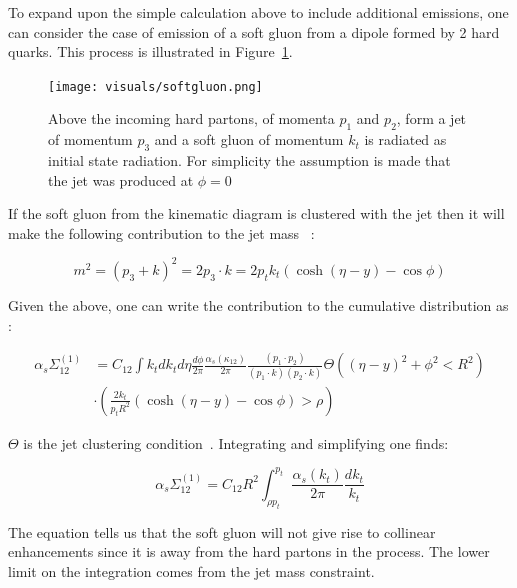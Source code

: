 To expand upon the simple calculation above to include additional emissions, one can consider the case of emission of a soft gluon from a dipole formed by 2 hard quarks. This process is illustrated in Figure~\ref{softgluon}.



\begin{figure}[htb]
\centering
\texttt{[image: visuals/softgluon.png]}
\caption{Above the incoming hard partons, of momenta $p_1$ and $p_2$, form a jet of momentum $p_3$ and a soft gluon of momentum $k_t$ is radiated as initial state radiation. For simplicity the assumption is made that the jet was produced at $\phi = 0$  }
\label{softgluon}
\end{figure}


If the soft gluon from the kinematic diagram is clustered with the jet then it will make the following contribution to the jet mass ~\cite{Marzani:2019hun}:\newline


\begin{equation}
m^{2}=\left(p_{3}+k\right)^{2}=2 p_{3} \cdot k=2 p_{t} k_{t}(\cosh (\eta-y)-\cos \phi)
\end{equation}

Given the above, one can write the contribution to the cumulative distribution as :\newline

\begin{equation}
\begin{aligned} \alpha_{s} \Sigma_{12}^{(1)} &=C_{12} \int k_{t} d k_{t} d \eta \frac{d \phi}{2 \pi} \frac{\alpha_{s}\left(\kappa_{12}\right)}{2 \pi} \frac{\left(p_{1} \cdot p_{2}\right)}{\left(p_{1} \cdot k\right)\left(p_{2} \cdot k\right)} \Theta\left((\eta-y)^{2}+\phi^{2}<R^{2}\right) \\ & \cdot\left(\frac{2 k_{t}}{p_{t} R^{2}}(\cosh (\eta-y)-\cos \phi)>\rho\right) \end{aligned}
\end{equation}

$\Theta$ is the jet clustering condition~\cite{Marzani:2019hun}. Integrating and simplifying one finds:\newline

\begin{equation}
\alpha_{s} \Sigma_{12}^{(1)}=C_{12} R^{2} \int_{\rho p_{t}}^{p_{t}} \frac{\alpha_{s}\left(k_{t}\right)}{2 \pi} \frac{d k_{t}}{k_{t}}
\end{equation}

The equation tells us that the soft gluon will not give rise to collinear enhancements since it is away from the hard partons in the process. The lower limit on the integration comes from the jet mass constraint.

